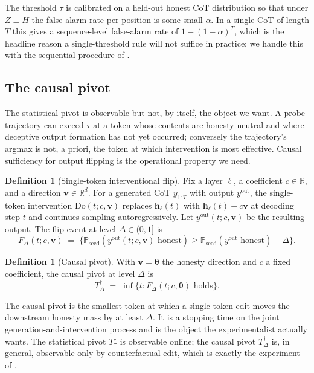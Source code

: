 \documentclass[11pt]{article}
\theoremstyle{definition}
\newtheorem{definition}[theorem]{Definition}
\newcommand{\R}{\mathbb{R}}
\newcommand{\Prob}{\mathbb{P}}
\newcommand{\1}{\mathbf{1}}
\newcommand{\hh}{\bm{h}}
\newcommand{\vv}{\bm{v}}
\newcommand{\thetab}{\bm{\theta}}
\begin{document}
The threshold $\tau$ is calibrated on a held-out honest CoT distribution so that under $Z \equiv H$ the false-alarm rate per position is some small $\alpha$. In a single CoT of length $T$ this gives a sequence-level false-alarm rate of $1 - (1-\alpha)^{T}$, which is the headline reason a single-threshold rule will not suffice in practice; we handle this with the sequential procedure of .

\subsection{The causal pivot}

The statistical pivot is observable but not, by itself, the object we want. A probe trajectory can exceed $\tau$ at a token whose contents are honesty-neutral and where deceptive output formation has not yet occurred; conversely the trajectory's argmax is not, a priori, the token at which intervention is most effective. Causal sufficiency for output flipping is the operational property we need.

\begin{definition}[Single-token interventional flip]
\label{def:flip}
Fix a layer $\ell$, a coefficient $c \in \R$, and a direction $\vv \in \R^d$. For a generated CoT $y_{1:T}$ with output $y^{\mathrm{out}}$, the single-token intervention $\mathrm{Do}(t; c, \vv)$ replaces $\hh_{\ell}(t)$ with $\hh_{\ell}(t) - c\vv$ at decoding step $t$ and continues sampling autoregressively. Let $y^{\mathrm{out}}(t; c, \vv)$ be the resulting output. The flip event at level $\Delta \in (0, 1]$ is
\[
F_{\Delta}(t; c, \vv) \;=\; \bigl\{ \Prob_{\mathrm{seed}} (\text{$y^{\mathrm{out}}(t; c, \vv)$ honest}) \ge \Prob_{\mathrm{seed}} (\text{$y^{\mathrm{out}}$ honest}) + \Delta \bigr\}.
\]
\end{definition}

\begin{definition}[Causal pivot]
\label{def:causal-pivot}
With $\vv = \thetab$ the honesty direction and $c$ a fixed coefficient, the causal pivot at level $\Delta$ is
\[
T^{\dagger}_{\Delta} \;=\; \inf\bigl\{t : F_{\Delta}(t; c, \thetab) \text{ holds}\bigr\}.
\]
\end{definition}

The causal pivot is the smallest token at which a single-token edit moves the downstream honesty mass by at least $\Delta$. It is a stopping time on the joint generation-and-intervention process and is the object the experimentalist actually wants. The statistical pivot $T^{\star}_{\tau}$ is observable online; the causal pivot $T^{\dagger}_{\Delta}$ is, in general, observable only by counterfactual edit, which is exactly the experiment of .
\end{document}
